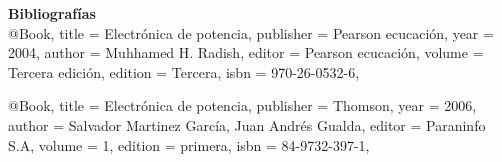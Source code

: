 \documentclass[a3paper,12pt]{article}
\begin{document}
\begin{LARGE}
	\textbf{Bibliografías}\\


	
	
	
	@Book{,
  title     = {Electrónica de potencia},
  publisher = {Pearson ecucación},
  year      = {2004},
  author    = {Muhhamed H. Radish},
  editor    = {Pearson ecucación},
  volume    = {Tercera edición},
  edition   = {Tercera},
  isbn      = {970-26-0532-6},
}

@Book{,
  title     = {Electrónica de potencia},
  publisher = {Thomson},
  year      = {2006},
  author    = {Salvador Martinez García, Juan Andrés Gualda},
  editor    = {Paraninfo S.A},
  volume    = {1},
  edition   = {primera},
  isbn      = {84-9732-397-1},
}
\end{LARGE}
\end{document}
